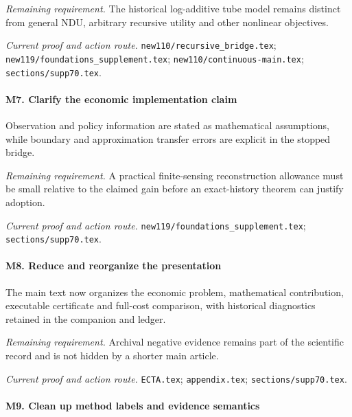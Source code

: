 \par\emph{Remaining requirement.} The historical log-additive tube model remains distinct from general NDU, arbitrary recursive utility and other nonlinear objectives.

\par\emph{Current proof and action route.} \nolinkurl{new110/recursive_bridge.tex}; \nolinkurl{new119/foundations_supplement.tex}; \nolinkurl{new110/continuous-main.tex}; \nolinkurl{sections/supp70.tex}.

\paragraph{M7. Clarify the economic implementation claim}

Observation and policy information are stated as mathematical assumptions, while boundary and approximation transfer errors are explicit in the stopped bridge.

\par\emph{Remaining requirement.} A practical finite-sensing reconstruction allowance must be small relative to the claimed gain before an exact-history theorem can justify adoption.

\par\emph{Current proof and action route.} \nolinkurl{new119/foundations_supplement.tex}; \nolinkurl{sections/supp70.tex}.

\paragraph{M8. Reduce and reorganize the presentation}

The main text now organizes the economic problem, mathematical contribution, executable certificate and full-cost comparison, with historical diagnostics retained in the companion and ledger.

\par\emph{Remaining requirement.} Archival negative evidence remains part of the scientific record and is not hidden by a shorter main article.

\par\emph{Current proof and action route.} \nolinkurl{ECTA.tex}; \nolinkurl{appendix.tex}; \nolinkurl{sections/supp70.tex}.

\paragraph{M9. Clean up method labels and evidence semantics}

